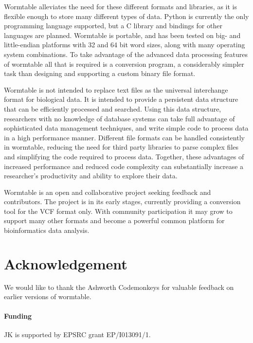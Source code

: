 \documentclass{bioinfo}
\begin{document}
Wormtable alleviates the need for these different formats and libraries,
as it is flexible enough to store many different types of data. Python 
is currently the only programming language supported, but a C library
and bindings for other languages are planned. Wormtable is portable,
and has been tested on big- and little-endian platforms with 32 and 64
bit word sizes, along with many operating system combinations. To 
take advantage of the advanced data processing features of wormtable
all that is required is a conversion program, a considerably simpler
task than designing and supporting a custom binary file format.

Wormtable is not intended to replace text files as the universal 
interchange format for biological data. 
It is intended to provide a persistent data structure 
that can be efficiently processed 
and searched. Using this data structure, researchers with no knowledge of 
database systems can take full advantage of sophisticated 
data management techniques, and write simple code to process 
data in a high performance manner. 
Different file formats can be handled consistently 
in wormtable, reducing the need for third party libraries 
to parse complex files and simplifying the code required 
to process data.
Together, these advantages of increased performance and reduced 
code complexity can substantially increase a researcher's 
productivity and ability to explore their data.

Wormtable is an open and collaborative project seeking feedback and 
contributors. The project is in its early stages, currently 
providing a conversion tool for the VCF format only. With community
participation it may grow to support many other formats and become
a powerful common platform for bioinformatics data analysis.

\section*{Acknowledgement}
We would like to thank the Ashworth Codemonkeys for valuable feedback on earlier
versions of wormtable.
\paragraph{Funding\textcolon}  
JK is supported by EPSRC grant EP/I013091/1.



\end{document}
